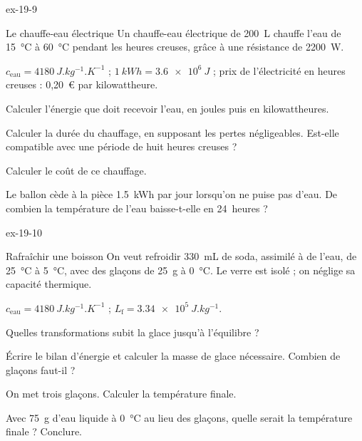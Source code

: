 \begin{blocLivre}{ex-19-9}
\begin{exercice}[2]{Le chauffe-eau électrique}
Un chauffe-eau électrique de \qty{200}{L} chauffe l'eau de \qty{15}{\degreeCelsius} à \qty{60}{\degreeCelsius} pendant les heures
creuses, grâce à une résistance de \qty{2200}{W}.
\begin{donnees}
$c_\mathrm{eau}=\qty{4180}{J.kg^{-1}.K^{-1}}$ ; $\qty{1}{kWh}=\qty{3,6e6}{J}$ ; prix de l'électricité en heures creuses :
0,20~€ par kilowattheure.
\end{donnees}
\begin{questions}
\item Calculer l'énergie que doit recevoir l'eau, en joules puis en kilowattheures.
\item Calculer la durée du chauffage, en supposant les pertes négligeables. Est-elle compatible avec une période de
huit heures creuses ?
\item Calculer le coût de ce chauffage.
\item Le ballon cède à la pièce \qty{1,5}{kWh} par jour lorsqu'on ne puise pas d'eau. De combien la température de l'eau
baisse-t-elle en 24~heures ?
\end{questions}
\end{exercice}
\end{blocLivre}
\begin{blocLivre}{ex-19-10}
\begin{exercice}[2]{Rafraîchir une boisson}
On veut refroidir \qty{330}{mL} de soda, assimilé à de l'eau, de \qty{25}{\degreeCelsius} à \qty{5}{\degreeCelsius}, avec des glaçons de
\qty{25}{g} à \qty{0}{\degreeCelsius}. Le verre est isolé ; on néglige sa capacité thermique.
\begin{donnees}
$c_\mathrm{eau}=\qty{4180}{J.kg^{-1}.K^{-1}}$ ; $L_\mathrm{f}=\qty{3,34e5}{J.kg^{-1}}$.
\end{donnees}
\begin{questions}
\item Quelles transformations subit la glace jusqu'à l'équilibre ?
\item Écrire le bilan d'énergie et calculer la masse de glace nécessaire. Combien de glaçons faut-il ?
\item On met trois glaçons. Calculer la température finale.
\item Avec \qty{75}{g} d'eau liquide à \qty{0}{\degreeCelsius} au lieu des glaçons, quelle serait la température finale ? Conclure.
\end{questions}
\end{exercice}
\end{blocLivre}
